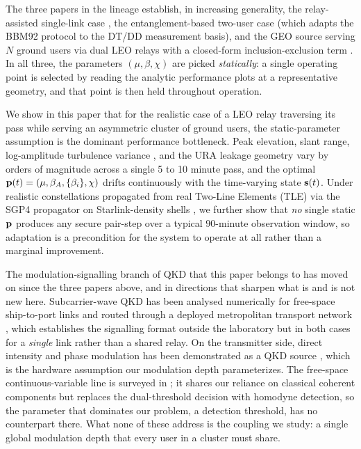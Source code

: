 The three papers in the lineage establish, in increasing generality, the relay-assisted single-link case \cite{vu2020access}, the entanglement-based two-user case \cite{vu2022access} (which adapts the BBM92 protocol \cite{bbm92} to the DT/DD measurement basis), and the GEO source serving $N$ ground users via dual LEO relays with a closed-form inclusion-exclusion term \cite{vu2023photonics}. In all three, the parameters $(\mu, \beta, \chi)$ are picked \emph{statically}: a single operating point is selected by reading the analytic performance plots at a representative geometry, and that point is then held throughout operation.

We show in this paper that for the realistic case of a LEO relay traversing its pass while serving an asymmetric cluster of ground users, the static-parameter assumption is the dominant performance bottleneck. Peak elevation, slant range, log-amplitude turbulence variance \cite{andrews2005laser,vetelino2007fade}, and the URA leakage geometry vary by orders of magnitude across a single 5 to 10 minute pass, and the optimal $\mathbf{p}(t) = (\mu, \beta_A, \{\beta_i\}, \chi)$ drifts continuously with the time-varying state $\mathbf{s}(t)$. Under realistic constellations propagated from real Two-Line Elements (TLE) via the SGP4 propagator \cite{hoots1980sgp4,vallado2006sgp4} on Starlink-density shells \cite{del2019leosat,leyva2021inter}, we further show that \emph{no} single static $\mathbf{p}$ produces any secure pair-step over a typical $90$-minute observation window, so adaptation is a precondition for the system to operate at all rather than a marginal improvement.

The modulation-signalling branch of QKD that this paper belongs to has moved on since the three papers above, and in directions that sharpen what is and is not new here. Subcarrier-wave QKD has been analysed numerically for free-space ship-to-port links \cite{goncharov2025scw} and routed through a deployed metropolitan transport network \cite{tarabrina2023scw}, which establishes the signalling format outside the laboratory but in both cases for a \emph{single} link rather than a shared relay. On the transmitter side, direct intensity and phase modulation has been demonstrated as a QKD source \cite{liu2026intensity}, which is the hardware assumption our modulation depth parameterizes. The free-space continuous-variable line is surveyed in \cite{kargina2026cvqkd}; it shares our reliance on classical coherent components but replaces the dual-threshold decision with homodyne detection, so the parameter that dominates our problem, a detection threshold, has no counterpart there. What none of these address is the coupling we study: a single global modulation depth that every user in a cluster must share.

